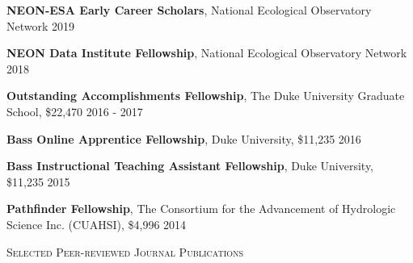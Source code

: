 \documentclass[10pt]{article}
\newenvironment{changemargin}[2]{%
  \begin{list}{}{%
 \setlength{\topsep}{0pt}%
 \setlength{\leftmargin}{#1}%
 \setlength{\rightmargin}{#2}%
 \setlength{\listparindent}{\parindent}%
 \setlength{\itemindent}{\parindent}%
 \setlength{\parsep}{\parskip}%
  }%
  \item[]}{\end{list}
}
\newcommand{\lineover}{
  \begin{changemargin}{-0.05in}{-0.05in}
  \vspace*{-8pt}
  \hrulefill \\
  \vspace*{-2pt}
  \end{changemargin}
}
\newcommand{\header}[1]{
  \begin{changemargin}{-0.5in}{-0.5in}
  \scshape{#1}\\
  \lineover
  \end{changemargin}
}
\newenvironment{body} {
  \vspace*{-2pt}
  \begin{changemargin}{-0.5in}{-0.5in}
}
{\end{changemargin}
}
\begin{document}
\begin{body}
  \textbf{NEON-ESA Early Career Scholars}, National Ecological Observatory Network \hfill {2019}\\
  \smallskip

  \textbf{NEON Data Institute Fellowship}, National Ecological Observatory Network  \hfill {2018}\\
  \smallskip

  \textbf{Outstanding Accomplishments Fellowship}, The Duke University Graduate School, \$22,470 \hfill {2016 - 2017}\\
  \smallskip


  \textbf{Bass Online Apprentice Fellowship}, Duke University, \$11,235 \hfill {2016}\\
  \smallskip

  \textbf{Bass Instructional Teaching Assistant Fellowship}, Duke University, \$11,235 \hfill {2015}\\
  \smallskip

  \textbf{Pathfinder Fellowship}, The Consortium for the Advancement of Hydrologic Science Inc. (CUAHSI), \$4,996  \hfill {2014}\\

\end{body}
\smallskip

\header{Selected Peer-reviewed Journal Publications}
\end{document}
